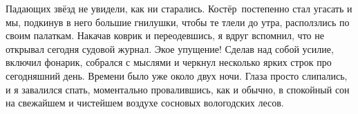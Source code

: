 Падающих звёзд не увидели, как ни старались. Костёр~постепенно стал угасать и мы, подкинув в него большие гнилушки, чтобы те тлели до утра, расползлись по своим палаткам. Накачав коврик и переодевшись, я вдруг вспомнил, что не открывал сегодня судовой журнал. Экое упущение! Сделав над собой усилие, включил фонарик, собрался с мыслями и черкнул несколько ярких строк про сегодняшний день. Времени было уже около двух ночи. Глаза просто слипались, и я завалился спать, моментально провалившись, как и обычно, в спокойный сон на свежайшем и чистейшем воздухе сосновых вологодских лесов.

\begin{center}
\end{center}